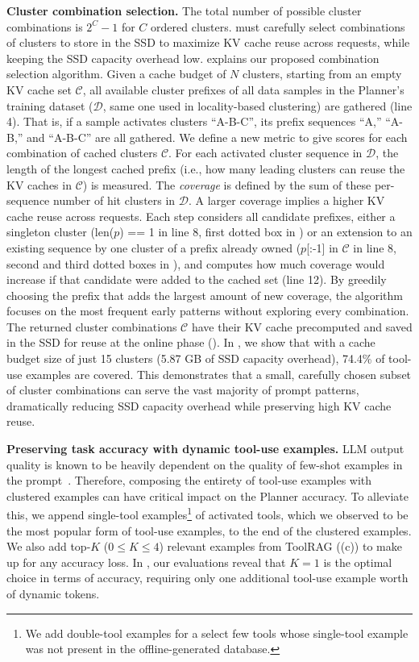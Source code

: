 {\bf Cluster combination selection.}
The total number of possible cluster combinations is $2^C-1$ for $C$ ordered clusters. \prefill must carefully select combinations of clusters to store in the SSD to maximize KV cache reuse across requests, while keeping the SSD capacity overhead low.  explains our proposed combination selection algorithm. Given a cache budget of $N$ clusters, starting from an empty KV cache set $\mathcal{C}$, all available cluster prefixes of all data samples in the Planner's training dataset ($\mathcal{D}$, same one used in locality-based clustering) are gathered (line 4). That is, if a sample activates clusters ``A-B-C'', its prefix sequences ``A,'' ``A-B,'' and ``A-B-C'' are all gathered. We define a new metric to give scores for each combination of cached clusters $\mathcal{C}$. For each activated cluster sequence in $\mathcal{D}$, the length of the longest cached prefix (i.e., how many leading clusters can reuse the KV caches in $\mathcal{C}$) is measured. The \textit{coverage} is defined by the sum of these per-sequence number of hit clusters in $\mathcal{D}$. A larger coverage implies a higher KV cache reuse across requests. Each step considers all candidate prefixes, either a singleton cluster (len($p$) == 1 in line 8, first dotted box in ) or an extension to an existing sequence by one cluster of a prefix already owned ($p$[:-1] in $\mathcal{C}$ in line 8, second and third dotted boxes in ), and computes how much coverage would increase if that candidate were added to the cached set (line 12). By greedily choosing the prefix that adds the largest amount of new coverage, the algorithm focuses on the most frequent early patterns without exploring every combination. The returned cluster combinations $\mathcal{C}$ have their KV cache precomputed and saved in the SSD for reuse at the online phase (). In , we show that with a cache budget size of just 15 clusters (5.87 GB of SSD capacity overhead), 74.4\% of tool-use examples are covered. This demonstrates that a small, carefully chosen subset of cluster combinations can serve the vast majority of prompt patterns, dramatically reducing SSD capacity overhead while preserving high KV cache reuse.

{\bf Preserving task accuracy with dynamic tool-use examples.} LLM output quality is known to be heavily dependent on the quality of few-shot examples in the prompt~\cite{gpt3, what_makes_good_examples, metalcl}. Therefore, composing the entirety of tool-use examples with clustered examples can have critical impact on the Planner accuracy. To alleviate this, we append single-tool examples\footnote{We add double-tool examples for a select few tools whose single-tool example was not present in the offline-generated database.} of activated tools, which we observed to be the most popular form of tool-use examples, to the end of the clustered examples. We also add top-$K$ ($0 \le K \le 4$) relevant examples from ToolRAG ((c)) to make up for any accuracy loss. In , our evaluations reveal that $K=1$ is the optimal choice in terms of accuracy, requiring only one additional tool-use example worth of dynamic tokens.



